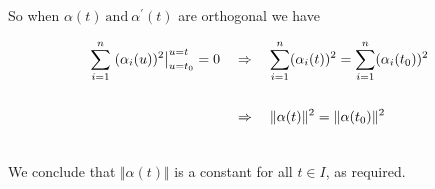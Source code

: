 \documentclass[12pt,letterpaper]{hmcpset}
\begin{document}
\begin{solution}
So when $\alpha(t)\ \text{and} \ \alpha^{\prime}(t)$ are orthogonal we have

\begin{align}
\sum_{i=1}^n\left.(\alpha_i(u))^2\right|_{u=t_0}^{u=t} = 0 \quad &\Rightarrow \quad \sum_{i=1}^n(\alpha_i(t))^2 = \sum_{i=1}^n (\alpha_i(t_0))^2 \notag\\
&\quad\notag\\
&\Rightarrow \quad \Vert \alpha(t) \Vert^2 = \Vert \alpha(t_0) \Vert^2 \notag\\
\notag
\end{align}

We conclude that $\Vert \alpha(t) \Vert $ is a constant for all $t \in I$, as required.

\end{solution}
\end{document}
